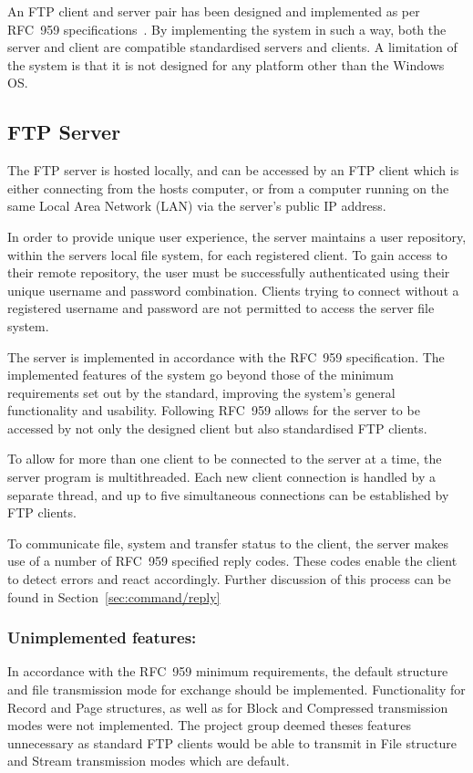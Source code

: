 \documentclass[10pt,twocolumn]{witseiepaper}
\begin{document}
An FTP client and server pair has been designed and implemented as per RFC~959 specifications~\cite{rfc959}. By implementing the system in such a way, both the server and client are compatible standardised servers and clients. A limitation of the system is that it is not designed for any platform other than the Windows OS.

\subsection{FTP Server}

The FTP server is hosted locally, and can be accessed by an FTP client which is either connecting from the hosts computer, or from a computer running on the same Local Area Network (LAN) via the server's public IP address. 

In order to provide unique user experience, the server maintains a user repository, within the servers local file system, for each registered client. To gain access to their remote repository, the user must be successfully authenticated using their unique username and password combination. Clients trying to connect without a registered username and password are not permitted to access the server file system.

The server is implemented in accordance with the RFC~959 specification. The implemented features of the system go beyond those of the minimum requirements set out by the standard, improving the system's general functionality and usability. Following RFC~959 allows for the server to be accessed by not only the designed client but also standardised FTP clients. 

To allow for more than one client to be connected to the server at a time, the server program is multithreaded. Each new client connection is handled by a separate thread, and up to five simultaneous connections can be established by FTP clients. 

To communicate file, system and transfer status to the client, the server makes use of a number of RFC~959 specified reply codes. These codes enable the client to detect errors and react accordingly. Further discussion of this process can be found in Section~\ref{sec:command/reply}

\subsubsection*{Unimplemented features: }
In accordance with the RFC~959 minimum requirements, the default structure and file transmission mode for exchange should be implemented. Functionality for Record and Page structures, as well as for Block and Compressed transmission modes were not implemented. The project group deemed theses features unnecessary as standard FTP clients would be able to transmit in File structure and Stream transmission modes which are default.
\end{document}
